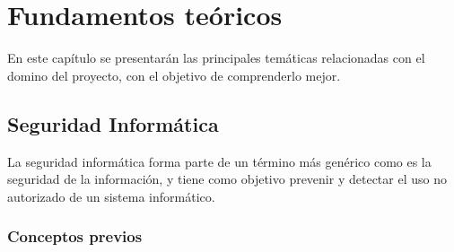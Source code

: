 \chapter{Fundamentos teóricos}
\label{estado}
En este capítulo se presentarán las principales temáticas relacionadas con el domino del proyecto, con el objetivo de comprenderlo mejor.

\section{Seguridad Informática}
La seguridad informática forma parte de un término más genérico como es la seguridad de la información, y tiene como objetivo prevenir y detectar el uso no autorizado de un sistema informático.

\subsection{Conceptos previos}

